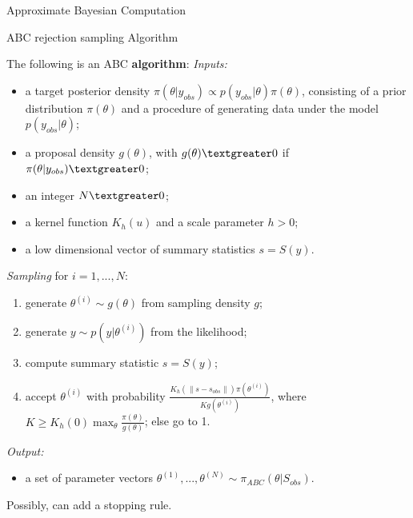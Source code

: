 \documentclass{beamer}
\begin{document}
\begin{section}{Approximate Bayesian Computation}
\begin{frame}{ABC rejection sampling Algorithm}
		\only<1> {
			The following is an ABC \textbf{algorithm}:
			\vspace{0.3cm}
			\emph{Inputs:}
			\begin{itemize}
				\item a target posterior density $\pi(\theta | y_{obs}) \propto p(y_{obs}|\theta) \pi(\theta)$, consisting of a prior distribution $\pi(\theta)$ and a procedure of generating data under the model $p(y_{obs}|\theta)$;
				\item a proposal density $g(\theta)$, with $g(\theta)\textgreater 0 $ if $\pi(\theta | y_{obs}) \textgreater 0$;
				\item an integer $N \textgreater0$;
				\item a kernel function $K_h(u)$ and a scale parameter $h > 0$;
				\item a low dimensional vector of summary statistics $s=S(y)$.
			\end{itemize}
		}
		 {
			\emph{Sampling} for $i= 1,..., N$:
			\begin{enumerate}
				\item generate $\theta ^ {(i)} \sim g(\theta)$ from sampling density $g$;
				\item generate $ y \sim p(y|\theta ^ {(i)})$ from the likelihood;
				\item compute summary statistic $s = S(y)$;
				\item accept $\theta ^ {(i)}$ with probability $\frac{K_h(\parallel s-s_{obs}\parallel)   \pi(\theta ^ {(i)})}{K g(\theta ^ {(i)})}$, where $K \geq K_h(0)\max_{\theta}{\frac{\pi(\theta)}{g(\theta)}}$; else go to 1.
			\end{enumerate}
			\emph{Output:}
			\begin{itemize}
				\item a set of parameter vectors $\theta ^ {(1)},..., \theta ^ {(N)} \sim \pi_{ABC}(\theta |S_{obs})$.
			\end{itemize}
		
		Possibly, can add a stopping rule.
		}
		

	\end{frame}
\end{section}
\end{document}
